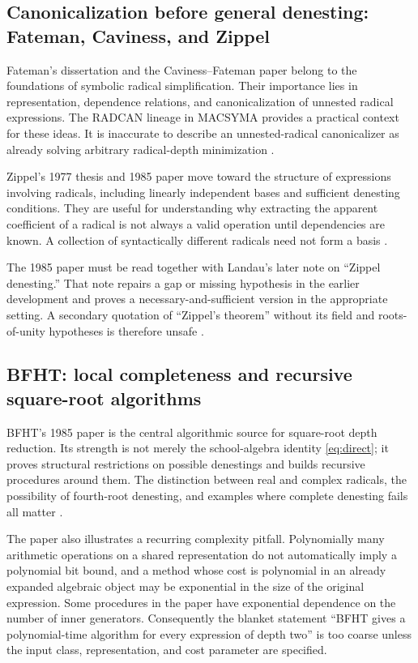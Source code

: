 \documentclass[11pt,letterpaper]{article}
\numberwithin{equation}{section}
\theoremstyle{definition}
\theoremstyle{remark}
\begin{document}
\subsection{Canonicalization before general denesting: Fateman, Caviness, and Zippel}
Fateman's dissertation and the Caviness--Fateman paper belong to the foundations of symbolic radical simplification. Their importance lies in representation, dependence relations, and canonicalization of unnested radical expressions. The RADCAN lineage in MACSYMA provides a practical context for these ideas. It is inaccurate to describe an unnested-radical canonicalizer as already solving arbitrary radical-depth minimization \cite{fateman,caviness}.

Zippel's 1977 thesis and 1985 paper move toward the structure of expressions involving radicals, including linearly independent bases and sufficient denesting conditions. They are useful for understanding why extracting the apparent coefficient of a radical is not always a valid operation until dependencies are known. A collection of syntactically different radicals need not form a basis \cite{zippel77,zippel85}.

The 1985 paper must be read together with Landau's later note on ``Zippel denesting.'' That note repairs a gap or missing hypothesis in the earlier development and proves a necessary-and-sufficient version in the appropriate setting. A secondary quotation of ``Zippel's theorem'' without its field and roots-of-unity hypotheses is therefore unsafe \cite{landauzippel}.

\subsection{BFHT: local completeness and recursive square-root algorithms}
BFHT's 1985 paper is the central algorithmic source for square-root depth reduction. Its strength is not merely the school-algebra identity \eqref{eq:direct}; it proves structural restrictions on possible denestings and builds recursive procedures around them. The distinction between real and complex radicals, the possibility of fourth-root denesting, and examples where complete denesting fails all matter \cite{bfht}.

The paper also illustrates a recurring complexity pitfall. Polynomially many arithmetic operations on a shared representation do not automatically imply a polynomial bit bound, and a method whose cost is polynomial in an already expanded algebraic object may be exponential in the size of the original expression. Some procedures in the paper have exponential dependence on the number of inner generators. Consequently the blanket statement ``BFHT gives a polynomial-time algorithm for every expression of depth two'' is too coarse unless the input class, representation, and cost parameter are specified.
\end{document}

